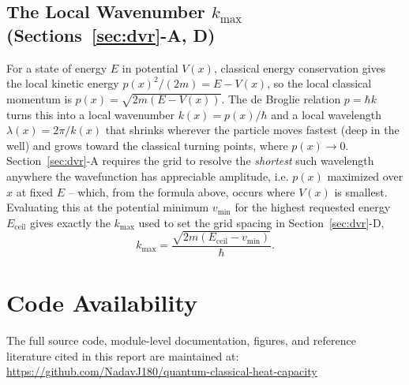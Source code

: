 \documentclass[10pt,conference]{IEEEtran}
\begin{document}
\subsection{The Local Wavenumber $k_{\max}$ (Sections~\ref{sec:dvr}-A, D)}
For a state of energy $E$ in potential $V(x)$, classical energy conservation gives the local kinetic energy $p(x)^2/(2m)=E-V(x)$, so the local classical momentum is $p(x)=\sqrt{2m(E-V(x))}$. The de Broglie relation $p=\hbar k$ turns this into a local wavenumber $k(x)=p(x)/\hbar$ and a local wavelength $\lambda(x)=2\pi/k(x)$ that shrinks wherever the particle moves fastest (deep in the well) and grows toward the classical turning points, where $p(x)\to0$. Section~\ref{sec:dvr}-A requires the grid to resolve the \emph{shortest} such wavelength anywhere the wavefunction has appreciable amplitude, i.e. $p(x)$ maximized over $x$ at fixed $E$ -- which, from the formula above, occurs where $V(x)$ is smallest. Evaluating this at the potential minimum $v_{\min}$ for the highest requested energy $E_{\text{ceil}}$ gives exactly the $k_{\max}$ used to set the grid spacing in Section~\ref{sec:dvr}-D,
\begin{equation}
k_{\max} = \frac{\sqrt{2m\left(E_{\text{ceil}}-v_{\min}\right)}}{\hbar}.
\end{equation}

\section*{Code Availability}
The full source code, module-level documentation, figures, and reference literature cited in this report are maintained at:\\
\url{https://github.com/NadavJ180/quantum-classical-heat-capacity}
\end{document}
